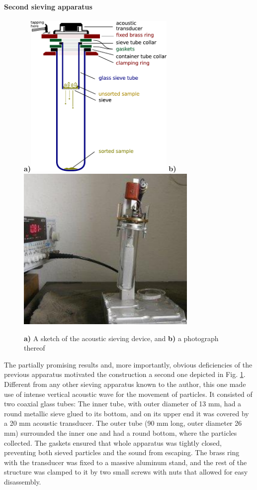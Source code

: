 \paragraph{Second sieving apparatus}%
\begin{figure}[ht] \caption{\textbf{a)} A sketch of the acoustic sieving device, and \textbf{b)} a photograph thereof} \label{fg_sieving2} \centering 
\textbf{a)}\includegraphics[height=8cm]{img/technology/sieve2_sieving_scheme.pdf}
\textbf{b)}\includegraphics[height=8cm]{img/technology/sieving_m.pdf}
\end{figure}
The partially promising results and, more importantly, obvious deficiencies of the previous apparatus motivated the construction a second one depicted in Fig. \ref{fg_sieving2}.
Different from any other sieving apparatus known to the author, this one made use of intense vertical acoustic wave for the movement of particles. It consisted of two coaxial glass tubes: The inner tube, with outer diameter of 13 mm, had a round metallic sieve glued to its bottom, and on its upper end it was covered by a 20 mm acoustic transducer. The outer tube (90 mm long, outer diameter 26 mm) surrounded the inner one and had a round bottom, where the particles collected. 
The gaskets ensured that whole apparatus was tightly closed, preventing both sieved particles and the sound from escaping. The brass ring with the transducer was fixed to a massive aluminum stand, and the rest of the structure was clamped to it by two small screws with nuts that allowed for easy disassembly. 

